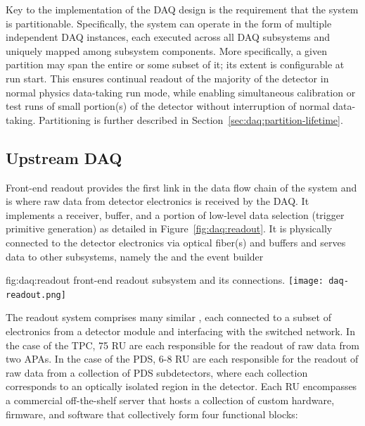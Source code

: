 Key to the implementation of the DAQ design is the requirement that
the system is partitionable. Specifically, the system can operate in
the form of multiple independent DAQ instances, each 
executed across all DAQ subsystems and uniquely mapped among subsystem components. 
More specifically, a given partition may span the entire %
 or some subset of it; its extent is configurable at
run start. This ensures continual readout of the
majority of the detector in normal physics data-taking run mode, while
enabling simultaneous calibration or test runs of small portion(s) of the
detector without interruption of normal data-taking. 
Partitioning is further described in Section~\ref{sec:daq:partition-lifetime}.

\subsection{Upstream DAQ}
\label{sec:daq:design-readout}

Front-end readout provides the first link in the data flow chain of
the  system and is where raw data from detector electronics
is received by the DAQ.
It implements a receiver, buffer, and a portion of low-level data
selection (trigger primitive generation) as detailed in Figure~\ref{fig:daq:readout}.
It is physically connected to the detector electronics via optical fiber(s) and buffers and serves data to other  subsystems, namely the  and the event builder


\begin{dunefigure}{fig:daq:readout}{  front-end
    readout subsystem and its connections.}
  \texttt{[image: daq-readout.png]}
\end{dunefigure}


The readout system comprises many similar , each
connected to a subset of electronics from a detector module and
interfacing with the  switched network. In the case of the
TPC, 75 RU are each responsible for the readout of raw data from two
APAs. In the case of the PDS, 6-8 RU are each responsible for the
readout of raw data from a collection of PDS subdetectors, where each
collection corresponds to an optically isolated region in the
detector. 
Each RU encompasses a commercial off-the-shelf server that hosts a
collection of custom hardware, 
firmware, and software that collectively form four functional blocks:

